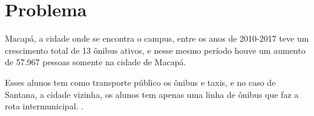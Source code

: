 % 


\section {Problema}
\begin{comment}
	Na cidade de Macapá e Santana, as duas maiores cidade do Amapá, o número de transporte coletivo é baixo,
	existe apenas duas rodovias que interligam as cidades, 
	se locomover se torna difícil \cite{sau2018}. %
	
	Com tantos problemas aparentes causadas pelo grande inchaço populacional que  vive nas áreas urbanas, cerca de 80\% da população das duas cidades reside em áreas urbanas e sofre com a insuficiência do sistema de transporte público oferecido \cite{tostes}.
\end{comment}




Macapá, a cidade onde se encontra o campus,  entre os  anos de 2010-2017 teve um crescimento total de 13 ônibus ativos, e nesse mesmo período houve um aumento de 57.967 pessoas somente na cidade de Macapá. 

Esses alunos tem como transporte público os ônibus e taxis, e no caso de Santana, a cidade vizinha, os alunos tem apenas uma linha de ônibus que faz a rota intermunicipal. \cite{sau2018}.


 
